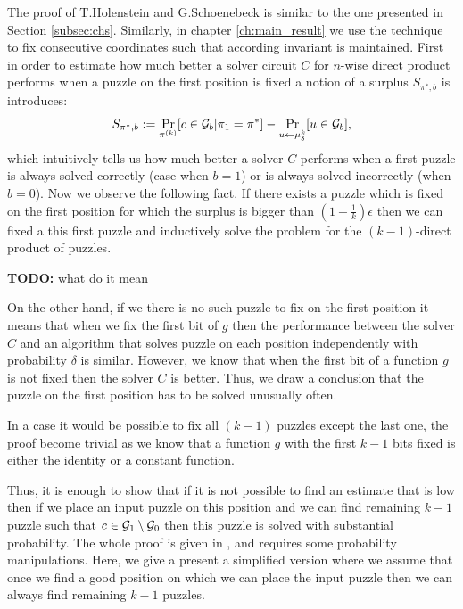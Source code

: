 The proof of T.Holenstein and G.Schoenebeck is similar to the one presented in Section \ref{subsec:chs}.
Similarly, in chapter \ref{ch:main_result} we use the technique to fix consecutive coordinates such that according invariant is maintained.
First in order to estimate how much better a solver circuit $C$ for $n$-wise direct product performs when
a puzzle on the first position is fixed a notion of a surplus $S_{\pi^*, b}$ is introduces:
\begin{align*}
S_{\pi^*, b} := \Pr_{\pi^{(k)}} [ c \in \mathcal{G}_b | \pi_1 = \pi^* ] - \Pr_{u \leftarrow \mu_{\delta}^{k}} [u \in \mathcal{G}_b],
\end{align*}
which intuitively tells us how much better a solver $C$ performs when a first puzzle is always solved correctly (case when $b = 1$)
or is always solved incorrectly (when $b = 0$).
Now we observe the following fact. If there exists a puzzle which is fixed on the first position for which the surplus is bigger than
$(1 - \frac{1}{k})\epsilon$ then we can fixed a this first puzzle and inductively solve the problem for the $(k-1)$-direct product of puzzles.
\begin{todo}
  \textbf{TODO:} what do it mean
\end{todo}
On the other hand, if we there is no such puzzle to fix on the first position it means that when we fix the first bit of $g$ then
the performance between the solver $C$ and an algorithm that solves puzzle on each position independently with probability $\delta$
is similar. However, we know that when the first bit of a function $g$ is not fixed then the solver $C$ is better.
Thus, we draw a conclusion that the puzzle on the first position has to be solved unusually often.

In a case it would be possible to fix all $(k-1)$ puzzles except the last one, the proof become trivial as we know that a function
$g$ with the first $k-1$ bits fixed is either the identity or a constant function.

Thus, it is enough to show that if it is not possible to find an estimate that is low then
if we place an input puzzle on this position and we can find remaining $k-1$ puzzle such that
$c \in \mathcal{G}_1 \setminus \mathcal{G}_0$ then this puzzle is solved with substantial probability.
The whole proof is given in \cite{DBLP:journals/corr/abs-1002-3534}, and requires some probability manipulations.
Here, we give a present a simplified version where we assume that once we find a good position on which we can place the input puzzle then
we can always find remaining $k-1$ puzzles.

